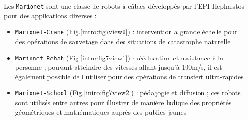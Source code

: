 Les {\tt Marionet} sont une classe de robots à câbles développés par l'EPI Hephaistos pour des applications diverses :
\begin{itemize}
 \item {\tt Marionet-Crane} (Fig.\ref{intro:fig7view0}) : intervention à grande échelle pour des opérations de sauvetage dans des situations de catastrophe naturelle
 \item {\tt Marionet-Rehab} (Fig.\ref{intro:fig7view1}) : rééducation et assistance à la personne ; pouvant atteindre des vitesses allant jusqu'à 100m/s, il est également possible de l'utiliser pour des opérations de transfert ultra-rapides
 \item {\tt Marionet-School} (Fig.\ref{intro:fig7view2}) : pédagogie et diffusion ; ces robots sont utilisés entre autres pour illustrer de manière ludique des propriétés géométriques et mathématiques auprès des publics jeunes
\end{itemize}

